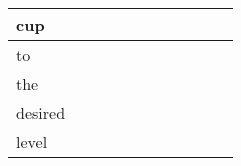 \documentclass[landscape]{article}
\newcommand{\ssp}{\hspace{2pt}}
\begin{document}
\begin{tabular}{|l|p{10pt}|p{10pt}|p{10pt}|p{10pt}|p{10pt}|p{10pt}|p{10pt}|p{10pt}|p{10pt}|p{10pt}|}
\hline
\ssp cup \ssp&\hspace{2pt}&\hspace{2pt}&\hspace{2pt}&\hspace{2pt}&\hspace{2pt}&\hspace{2pt}&\hspace{2pt}&\hspace{2pt}&\hspace{2pt}&\hspace{2pt}\\
\hline
\ssp to \ssp&\hspace{2pt}&\hspace{2pt}&\hspace{2pt}&\hspace{2pt}&\hspace{2pt}&\hspace{2pt}&\hspace{2pt}&\hspace{2pt}&\hspace{2pt}&\hspace{2pt}\\
\hline
\ssp the \ssp&\hspace{2pt}&\hspace{2pt}&\hspace{2pt}&\hspace{2pt}&\hspace{2pt}&\hspace{2pt}&\hspace{2pt}&\hspace{2pt}&\hspace{2pt}&\hspace{2pt}\\
\hline
\ssp desired \ssp&\hspace{2pt}&\hspace{2pt}&\hspace{2pt}&\hspace{2pt}&\hspace{2pt}&\hspace{2pt}&\hspace{2pt}&\hspace{2pt}&\hspace{2pt}&\hspace{2pt}\\
\hline
\ssp level \ssp&\hspace{2pt}&\hspace{2pt}&\hspace{2pt}&\hspace{2pt}&\hspace{2pt}&\hspace{2pt}&\hspace{2pt}&\hspace{2pt}&\hspace{2pt}&\hspace{2pt}\\

\end{tabular}
\end{document}
